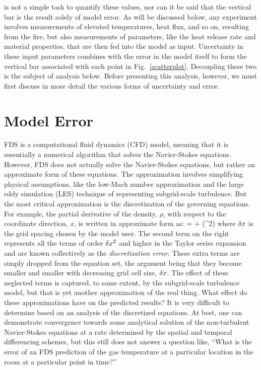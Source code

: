 is not a simple task to quantify these values, nor can it be said that the vertical bar is the result solely of model error. As will be discussed below, any
experiment involves measurements of elevated temperatures, heat flux, and so on, resulting from the fire, but also measurements of parameters, like the
heat release rate and material properties, that are then fed into the model as input. Uncertainty in these input parameters combines with the error in the model
itself to form the vertical bar associated with each point in Fig.~\ref{scatterplot}. Decoupling these two is the subject of analysis below. Before presenting this
analysis, however, we must first discuss in more detail the various forms of uncertainty and error.


\section{Model Error}

FDS is a computational fluid dynamics (CFD) model, meaning that it is essentially a numerical algorithm that solves the Navier-Stokes equations.
However, FDS does not actually solve the Navier-Stokes equations, but rather an approximate form of these equations. The approximation involves simplifying
physical assumptions, like the low-Mach number approximation and the large eddy simulation (LES) technique of representing subgrid-scale turbulence.
But the most critical approximation is the discretization of the governing equations. For example, the partial derivative of the density, $\rho$,
with respect to the coordinate direction, $x$, is written in approximate form as:
\be {} =  + (\dx^2) \ee
where $\delta x$ is the grid spacing chosen by the model user.
The second term on the right represents all the terms of order $\delta x^2$ and higher in the Taylor series expansion and are known collectively as the
{\em discretization error}. These extra terms are simply dropped from
the equation set, the argument being that they become smaller and smaller with decreasing grid cell size, $\delta x$. The effect of these neglected terms is captured, to
some extent, by the subgrid-scale turbulence model, but that is yet another approximation of the real thing. What effect do these approximations have on
the predicted results? It is very difficult to determine based on an analysis of the discretized equations. At best, one can demonstrate convergence towards some
analytical solution of the non-turbulent Navier-Stokes equations at a rate determined by the spatial and temporal differencing schemes, but this still does not answer a
question like, ``What is the error of an FDS prediction of the gas temperature at a particular location in the room at a particular point in time?''

